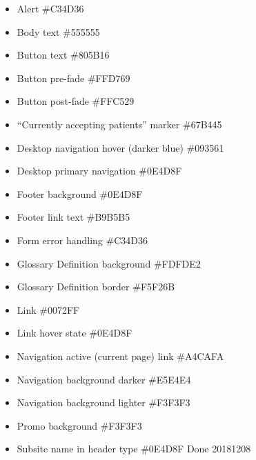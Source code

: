 \documentclass[
]{article}
\providecommand{\tightlist}{%
  \setlength{\itemsep}{0pt}\setlength{\parskip}{0pt}}
\begin{document}
\begin{itemize}
\tightlist
\item
  Alert \#C34D36
\item
  Body text \#555555
\item
  Button text \#805B16
\item
  Button pre-fade \#FFD769
\item
  Button post-fade \#FFC529
\item
  ``Currently accepting patients'' marker \#67B445
\item
  Desktop navigation hover (darker blue) \#093561
\item
  Desktop primary navigation \#0E4D8F
\item
  Footer background \#0E4D8F
\item
  Footer link text \#B9B5B5
\item
  Form error handling \#C34D36
\item
  Glossary Definition background \#FDFDE2
\item
  Glossary Definition border \#F5F26B
\item
  Link \#0072FF
\item
  Link hover state \#0E4D8F
\item
  Navigation active (current page) link \#A4CAFA
\item
  Navigation background darker \#E5E4E4
\item
  Navigation background lighter \#F3F3F3
\item
  Promo background \#F3F3F3
\item
  Subsite name in header type \#0E4D8F Done 20181208
\end{itemize}
\end{document}
